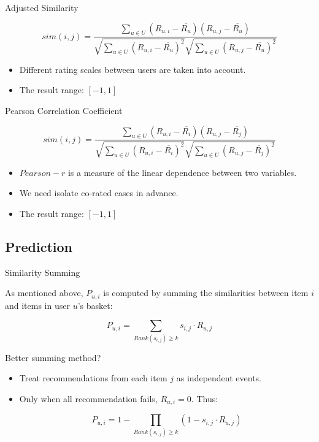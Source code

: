 \documentclass{beamer}
\begin{document}
\begin{frame}{Adjusted Similarity}

\begin{equation}
sim(i,j) = \frac{\sum_{u \in U}(R_{u,i} - \overline{R_u})(R_{u,j} - \overline{R_u})}{\sqrt{\sum_{u \in U}(R_{u,i} - \overline{R_u})^2}\sqrt{\sum_{u \in U}(R_{u,j} - \overline{R_u})^2}}
\end{equation}

\begin{itemize}
\item Different rating scales between users are taken into account.
\item The result range: $[-1,1]$
\end{itemize}

\end{frame}


\begin{frame}{Pearson Correlation Coefficient}

\begin{equation}
sim(i,j) = \frac{\sum_{u \in U}(R_{u,i} - \overline{R_i})(R_{u,j} - \overline{R_j})}{\sqrt{\sum_{u \in U}(R_{u,i} - \overline{R_i})^2}\sqrt{\sum_{u \in U}(R_{u,j} - \overline{R_j})^2}}
\end{equation}

\begin{itemize}
\item $Pearson-r$ is a measure of the linear dependence between two variables.
\item We need isolate co-rated cases in advance.
\item The result range: $[-1,1]$
\end{itemize}

\end{frame}


\subsection{Prediction}


\begin{frame}{Similarity Summing}

As mentioned above, $P_{u,i}$ is computed by summing the similarities between item $i$ and items in user $u$'s basket:

\begin{equation}
P_{u,i} = \sum_{Rank(s_{i,j})\geq k} s_{i,j} \cdot R_{u,j}
\end{equation}

\begin{block}{Better summing method?}
\begin{itemize}
\item Treat recommendations from each item $j$ as independent events.
\item Only when all recommendation fails, $R_{u,i} = 0$. Thus:

\begin{equation}
P_{u,i} = 1 - \prod_{Rank(s_{i,j})\geq k} (1 - s_{i,j} \cdot R_{u,j})
\end{equation}
\end{itemize}
\end{block}

\end{frame}
\end{document}
